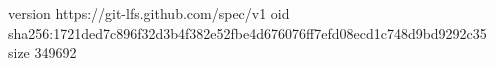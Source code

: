 version https://git-lfs.github.com/spec/v1
oid sha256:1721ded7c896f32d3b4f382e52fbe4d676076ff7efd08ecd1c748d9bd9292c35
size 349692
